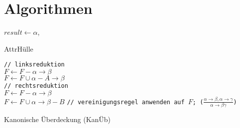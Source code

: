 \documentclass{article}
\begin{document}
	\section*{Algorithmen}
		\begin{algorithm}[H]
			\SetAlgoLined
			$result \leftarrow \alpha$,\\
			\caption{AttrH\"ulle}
		\end{algorithm}
		\begin{algorithm}[H]
			\SetAlgoLined
			\texttt{// linksreduktion}\\
			 {
				 {
					 {
						$F \leftarrow F - \alpha \rightarrow \beta$\\
						$F \leftarrow F \cup \alpha - A \rightarrow \beta$\\
					}
				}
			}
			\texttt{// rechtsreduktion}\\
			 {
				 {
					 {
						$F \leftarrow F - \alpha \rightarrow \beta$\\
						$F \leftarrow F \cup \alpha \rightarrow \beta - B$
					}
				}
			}
			\texttt{// vereinigungsregel anwenden auf $F$; ($\frac{\alpha \rightarrow \beta, \alpha \rightarrow \gamma}{\alpha \rightarrow \beta\gamma}$)}
			\caption{Kanonische \"Uberdeckung (Kan\"Ub)}
		\end{algorithm}
\end{document}
